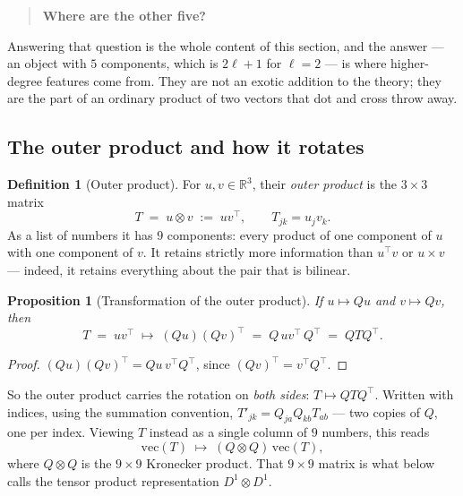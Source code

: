 \documentclass[11pt,a4paper]{report}
\newtheorem{proposition}[proposition]{Proposition}
\theoremstyle{definition}
\newtheorem{definition}[definition]{Definition}
\theoremstyle{remark}
\newcommand{\RR}{\mathbb R}
\begin{document}
\begin{quote}
\textbf{Where are the other five?}
\end{quote}

Answering that question is the whole content of this section, and the answer
--- an object with $5$ components, which is $2\ell+1$ for $\ell=2$ --- is
where higher-degree features come from. They are not an exotic addition to
the theory; they are the part of an ordinary product of two vectors that
dot and cross throw away.

\subsection{The outer product and how it rotates}

\begin{definition}[Outer product]
\label{def:outer-product}
For $u,v\in\RR^3$, their \emph{outer product} is the $3\times3$ matrix
\[
T \;=\; u\otimes v \;:=\; uv^\top ,
\qquad T_{jk}=u_jv_k .
\]
As a list of numbers it has $9$ components: every product of one component
of $u$ with one component of $v$. It retains strictly more information than
$u^\top v$ or $u\times v$ --- indeed, it retains everything about the pair
that is bilinear.
\end{definition}

\begin{proposition}[Transformation of the outer product]
\label{prop:outer-transform}
If $u\mapsto Qu$ and $v\mapsto Qv$, then
\[
T \;=\; uv^\top \;\longmapsto\; (Qu)(Qv)^\top \;=\; Q\,uv^\top\,Q^\top \;=\; QTQ^\top .
\]
\end{proposition}

\begin{proof}
$(Qu)(Qv)^\top = Qu\,v^\top Q^\top$, since $(Qv)^\top=v^\top Q^\top$.
\end{proof}

So the outer product carries the rotation on \emph{both sides}:
$T\mapsto QTQ^\top$. Written with indices, using the summation convention,
$T'_{jk}=Q_{ja}Q_{kb}T_{ab}$ --- two copies of $Q$, one per index. Viewing
$T$ instead as a single column of $9$ numbers, this reads
\[
\mathrm{vec}(T)\;\longmapsto\;(Q\otimes Q)\,\mathrm{vec}(T) ,
\]
where $Q\otimes Q$ is the $9\times9$ Kronecker product. That $9\times9$
matrix is what  below calls the tensor product
representation $D^1\otimes D^1$.
\end{document}
